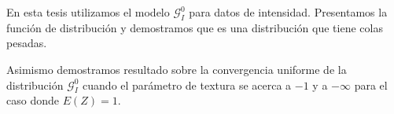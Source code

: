 En esta tesis utilizamos el modelo $\mathcal{G}_I^0$ para datos de intensidad. Presentamos la función de distribución y demostramos que es una distribución que tiene colas pesadas.

Asimismo demostramos resultado sobre la convergencia uniforme de la distribución $\mathcal{G}_I^0$ cuando el parámetro de textura se acerca a $-1$ y a $-\infty$ para el caso donde $E(Z)=1$.





